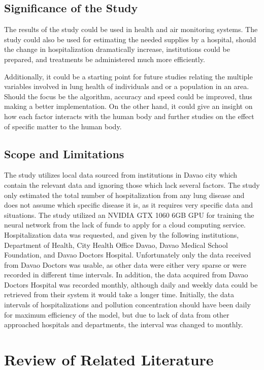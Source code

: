 \documentclass[10pt,11pt,12pt,oneside]{book}
\begin{document}
    \section{Significance of the Study}
    The results of the study could be used in health and air monitoring systems. The study could also be used for estimating the needed supplies by a hospital, should the change in hospitalization dramatically increase, institutions could be prepared, and treatments be administered much more efficiently.

    Additionally, it could be a starting point for future studies relating the multiple variables involved in lung health of individuals and or a population in an area. Should the focus be the algorithm, accuracy and speed could be improved, thus making a better implementation. On the other hand, it could give an insight on how each factor interacts with the human body and further studies on the effect of specific matter to the human body.
    \section{Scope and Limitations}
    The study utilizes local data sourced from institutions in Davao city which contain the relevant data and ignoring those which lack several factors. The study only estimated the total number of hospitalization from any lung disease and does not assume which specific disease it is, as it requires very specific data and situations. The study utilized an NVIDIA GTX 1060 6GB GPU for training the neural network from the lack of funds to apply for a cloud computing service.\\

    Hospitalization data was requested, and given by the following institutions, Department of Health, City Health Office Davao, Davao Medical School Foundation, and Davao Doctors Hospital. Unfortunately only the data received from Davao Doctors was usable, as other data were either very sparse or were recorded in different time intervals. In addition, the data acquired from Davao Doctors Hospital was recorded monthly, although daily and weekly data could be retrieved from
their system it would take a longer time. Initially, the data intervals of hospitalizations and pollution concentration should have been daily for maximum efficiency of the model, but due to lack of data from other approached hospitals and departments, the interval was changed to monthly.
\chapter{Review of Related Literature}
\end{document}
